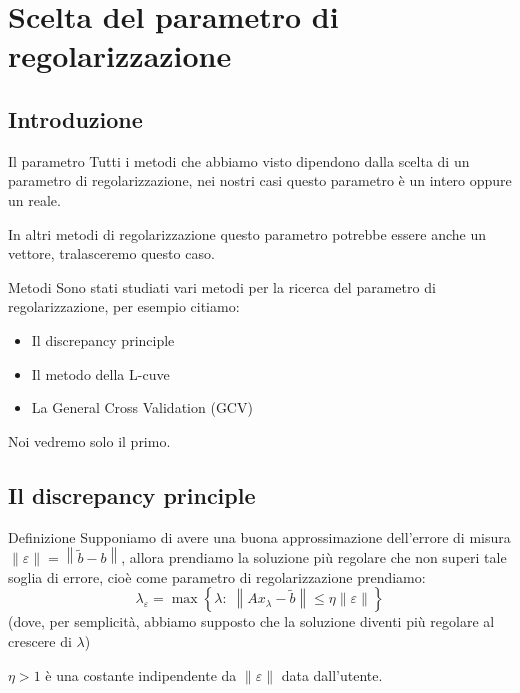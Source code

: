 \documentclass{beamer}
\theoremstyle{plain}
\theoremstyle{definition}
\theoremstyle{remark}
\newcommand{\set}[1]{\left\{#1\right\}}
\newcommand{\norm}[1]{\left\|#1\right\|}
\begin{document}
\section{Scelta del parametro di regolarizzazione}

\subsection{Introduzione}

\begin{frame}{Il parametro}
  Tutti i metodi che abbiamo visto dipendono dalla scelta di un
  parametro di regolarizzazione, nei nostri casi questo parametro è un
  intero oppure un reale.
  \vfill

  In altri metodi di regolarizzazione questo parametro potrebbe essere
  anche un vettore, tralasceremo questo caso.
\end{frame}

\begin{frame}{Metodi}
  Sono stati studiati vari metodi per la ricerca del parametro di
  regolarizzazione, per esempio citiamo:
  \begin{itemize}
  \item Il discrepancy principle
  \item Il metodo della L-cuve
  \item La General Cross Validation (GCV)
  \end{itemize}
  \vfill
  
  Noi vedremo solo il primo.
\end{frame}

\subsection{Il discrepancy principle}

\begin{frame}{Definizione}
  Supponiamo di avere una buona approssimazione dell'errore di misura
  $\norm{\varepsilon} = \norm{\tilde b - b}$, allora prendiamo la
  soluzione più regolare che non superi tale soglia di errore, cioè
  come parametro di regolarizzazione prendiamo:
  \[ \lambda _\varepsilon = \max \set { \lambda :\; \norm{ Ax_\lambda -
      \tilde b} \le \eta \norm{\varepsilon}} \]
  (dove, per semplicità, abbiamo supposto che la soluzione diventi più
  regolare al crescere di $\lambda$)

  $\eta >1$ è una costante indipendente da $\norm{\varepsilon}$ data
  dall'utente.
\end{frame}
\end{document}

